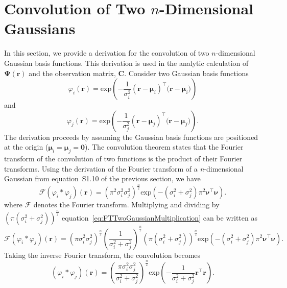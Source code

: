 \documentclass[]{article}
\begin{document}
\section*{Convolution of Two $n$-Dimensional Gaussians}\label{ap:ConvOfGaussians}
In this section, we provide a derivation for the convolution of two $n$-dimensional Gaussian basis functions. This derivation is used in the analytic calculation of $\boldsymbol\Psi(\mathbf{r})$ and the observation matrix, $\mathbf C$. Consider two Gaussian basis functions
\begin{equation}\label{eq:n_dimensional_Gaussian1}
 \varphi_i(\mathbf r)=\mathrm{exp}\left({-\frac{1}{\sigma_i^2} (\mathbf r-\boldsymbol \mu_i)^\top(\mathbf r-\boldsymbol \mu_i})\right)
\end{equation}
and 
\begin{equation}\label{eq:n_dimensional_Gaussian2}
\varphi_j(\mathbf r)=\mathrm{exp}\left({-\frac{1}{\sigma_j^2} (\mathbf r-\boldsymbol \mu_j)^\top(\mathbf r-\boldsymbol \mu_j})\right).
\end{equation}
The derivation proceeds by assuming the Gaussian basis functions are positioned at the origin ($\boldsymbol\mu_i=\boldsymbol\mu_j=\mathbf 0$). The convolution theorem states that the Fourier transform of the convolution of two functions is the product of their Fourier transforms. Using the derivation of the Fourier transform of a \emph{n}-dimensional Gaussian from equation~S1.10 of the previous section, we have
\begin{equation}\label{eq:FTTwoGaussianMultiplication}
\mathcal{F}\left(\varphi_i*\varphi_j\right)(\mathbf{r}) = \left(\pi^2\sigma_i^2\sigma_j^2\right)^{\frac{n}{2}}\mathrm{exp}\left(-(\sigma_i^2+\sigma_j^2)\pi^2\boldsymbol\nu^\top\boldsymbol\nu\right).
\end{equation}
where $\mathcal{F}$ denotes the Fourier transform. Multiplying and dividing by $\left(\pi\left(\sigma_i^2+\sigma_j^2\right)\right)^{\frac{n}{2}}$ equation~\ref{eq:FTTwoGaussianMultiplication} can be written as 
\begin{equation}
\mathcal{F}\left(\varphi_i*\varphi_j\right)(\mathbf{r}) = \left(\pi\sigma_i^2\sigma_j^2\right)^{\frac{n}{2}}\left(\frac{1}{\sigma_i^2+\sigma_j^2}\right)^{\frac{n}{2}} (\pi(\sigma_i^2+\sigma_j^2))^{\frac{n}{2}}\mathrm{exp}\left(-(\sigma_i^2+\sigma_j^2)\pi^2\boldsymbol\nu^\top\boldsymbol\nu\right).
\end{equation}
Taking the inverse Fourier transform, the convolution becomes
\begin{equation}\label{eq:ConvoftwoGaussian}
 \left(\varphi_i*\varphi_j\right)(\mathbf{r}) = \left(\frac{\pi\sigma_i^2\sigma_j^2}{\sigma_i^2+\sigma_j^2}\right)^{\frac{n}{2}}\mathrm{exp}\left({-\frac{1}{\sigma_i^2+\sigma_j^2} \mathbf r^\top\mathbf r}\right).
\end{equation}
\end{document}
